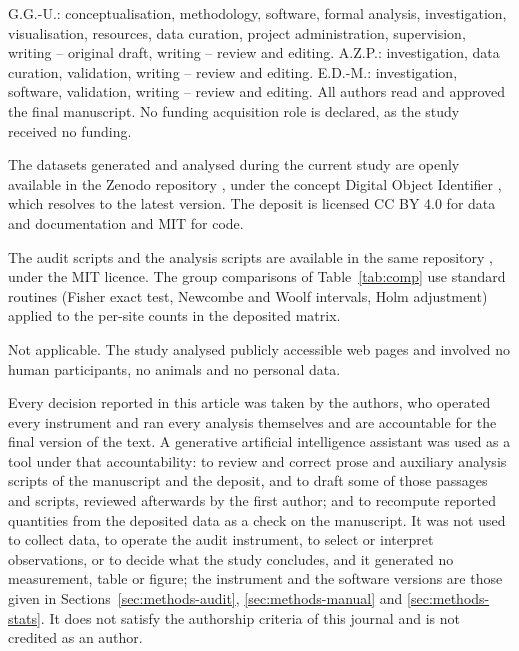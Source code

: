 \documentclass[pdflatex,sn-basic,Numbered,iicol]{sn-jnl}
\theoremstyle{thmstyleone}
\theoremstyle{thmstyletwo}
\theoremstyle{thmstylethree}
\begin{document}
G.G.-U.: conceptualisation, methodology, software, formal analysis, investigation, visualisation, resources, data curation, project administration, supervision, writing -- original draft, writing -- review and editing. A.Z.P.: investigation, data curation, validation, writing -- review and editing. E.D.-M.: investigation, software, validation, writing -- review and editing. All authors read and approved the final manuscript. No funding acquisition role is declared, as the study received no funding.

The datasets generated and analysed during the current study are openly available in the Zenodo repository \citep{deposito2026}, under the concept Digital Object Identifier , which resolves to the latest version. The deposit is licensed CC BY 4.0 for data and documentation and MIT for code.

The audit scripts and the analysis scripts are available in the same repository \citep{deposito2026}, under the MIT licence. The group comparisons of Table~\ref{tab:comp} use standard routines (Fisher exact test, Newcombe and Woolf intervals, Holm adjustment) applied to the per-site counts in the deposited matrix.

Not applicable. The study analysed publicly accessible web pages and involved no human participants, no animals and no personal data.

Every decision reported in this article was taken by the authors, who operated every instrument and ran every analysis themselves and are accountable for the final version of the text. A generative artificial intelligence assistant was used as a tool under that accountability: to review and correct prose and auxiliary analysis scripts of the manuscript and the deposit, and to draft some of those passages and scripts, reviewed afterwards by the first author; and to recompute reported quantities from the deposited data as a check on the manuscript. It was not used to collect data, to operate the audit instrument, to select or interpret observations, or to decide what the study concludes, and it generated no measurement, table or figure; the instrument and the software versions are those given in Sections~\ref{sec:methods-audit}, \ref{sec:methods-manual} and \ref{sec:methods-stats}. It does not satisfy the authorship criteria of this journal and is not credited as an author.
\end{document}
